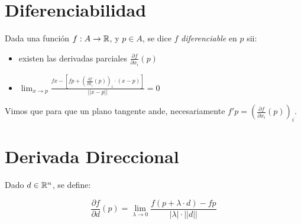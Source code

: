 \documentclass{article}
\begin{document}
\section*{Diferenciabilidad}
Dada una función $f : A \to \mathbb{R}$, y $p \in A$, se dice $f$ \emph{diferenciable}
en $p$ sii:
\begin{itemize}
	\item existen las derivadas parciales $\frac{\partial f}{\partial x_i}(p)$
	\item $
			\lim_{x \to p} \frac{fx-\left[fp + \left(\frac{\partial f}{\partial x_i}
			(p)\right)_i \cdot (x-p)\right]}{||x-p||} = 0
		$
\end{itemize}
Vimos que para que un plano tangente ande, necesariamente $f' p =
\left(\frac{\partial f}{\partial x_i} (p)\right)_i$.

\section*{Derivada Direccional}
Dado $d \in \mathbb{R}^n$, se define:

\[
	\frac{\partial f}{\partial d}(p) =
	\lim_{\lambda \to 0} \frac{f(p + \lambda \cdot d)-
	fp }{|\lambda| \cdot ||d||}
\]
\end{document}
